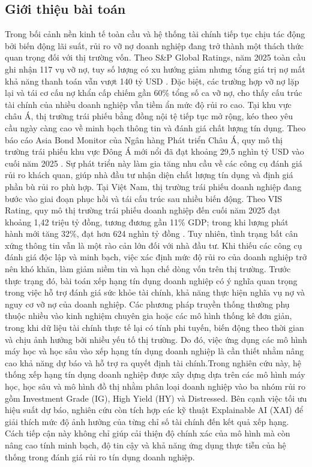 \documentclass[10pt,twoside]{article}
\begin{document}
\subsection{Giới thiệu bài toán}
Trong bối cảnh nền kinh tế toàn cầu và hệ thống tài chính tiếp tục chịu tác động bởi biến động lãi suất, rủi ro vỡ nợ doanh nghiệp đang trở thành một thách thức quan trọng đối với thị trường vốn. Theo S\&P Global Ratings, năm 2025 toàn cầu ghi nhận 117 vụ vỡ nợ, tuy số lượng có xu hướng giảm nhưng tổng giá trị nợ mất khả năng thanh toán vẫn vượt 140 tỷ USD \cite{noauthor_default_nodate}. Đặc biệt, các trường hợp vỡ nợ lặp lại và tái cơ cấu nợ khẩn cấp chiếm gần 60\% tổng số ca vỡ nợ, cho thấy cấu trúc tài chính của nhiều doanh nghiệp vẫn tiềm ẩn mức độ rủi ro cao. Tại khu vực châu Á, thị trường trái phiếu bằng đồng nội tệ tiếp tục mở rộng, kéo theo yêu cầu ngày càng cao về minh bạch thông tin và đánh giá chất lượng tín dụng. Theo báo cáo Asia Bond Monitor của Ngân hàng Phát triển Châu Á, quy mô thị trường trái phiếu khu vực Đông Á mới nổi đã đạt khoảng 29,5 nghìn tỷ USD vào cuối năm 2025 \cite{bank_asia_2025}. Sự phát triển này làm gia tăng nhu cầu về các công cụ đánh giá rủi ro khách quan, giúp nhà đầu tư nhận diện chất lượng tín dụng và định giá phần bù rủi ro phù hợp. Tại Việt Nam, thị trường trái phiếu doanh nghiệp đang bước vào giai đoạn phục hồi và tái cấu trúc sau nhiều biến động. Theo VIS Rating, quy mô thị trường trái phiếu doanh nghiệp đến cuối năm 2025 đạt khoảng 1,42 triệu tỷ đồng, tương đương gần 11\% GDP; trong khi lượng phát hành mới tăng 32\%, đạt hơn 624 nghìn tỷ đồng \cite{noauthor_vis_nodate}. Tuy nhiên, tình trạng bất cân xứng thông tin vẫn là một rào cản lớn đối với nhà đầu tư. Khi thiếu các công cụ đánh giá độc lập và minh bạch, việc xác định mức độ rủi ro của doanh nghiệp trở nên khó khăn, làm giảm niềm tin và hạn chế dòng vốn trên thị trường. Trước thực trạng đó, bài toán xếp hạng tín dụng doanh nghiệp có ý nghĩa quan trọng trong việc hỗ trợ đánh giá sức khỏe tài chính, khả năng thực hiện nghĩa vụ nợ và nguy cơ vỡ nợ của doanh nghiệp. Các phương pháp truyền thống thường phụ thuộc nhiều vào kinh nghiệm chuyên gia hoặc các mô hình thống kê đơn giản, trong khi dữ liệu tài chính thực tế lại có tính phi tuyến, biến động theo thời gian và chịu ảnh hưởng bởi nhiều yếu tố thị trường. Do đó, việc ứng dụng các mô hình máy học và học sâu vào xếp hạng tín dụng doanh nghiệp là cần thiết nhằm nâng cao khả năng dự báo và hỗ trợ ra quyết định tài chính.Trong nghiên cứu này, hệ thống xếp hạng tín dụng doanh nghiệp được xây dựng dựa trên các mô hình máy học, học sâu và mô hình đồ thị nhằm phân loại doanh nghiệp vào ba nhóm rủi ro gồm Investment Grade (IG), High Yield (HY) và Distressed. Bên cạnh việc tối ưu hiệu suất dự báo, nghiên cứu còn tích hợp các kỹ thuật Explainable AI (XAI) để giải thích mức độ ảnh hưởng của từng chỉ số tài chính đến kết quả xếp hạng. Cách tiếp cận này không chỉ giúp cải thiện độ chính xác của mô hình mà còn nâng cao tính minh bạch, độ tin cậy và khả năng ứng dụng thực tiễn của hệ thống trong đánh giá rủi ro tín dụng doanh nghiệp.
\end{document}
